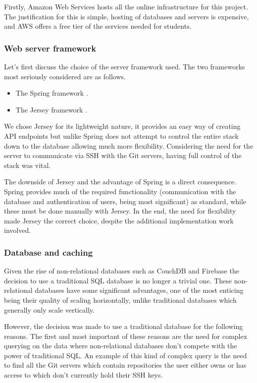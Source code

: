 Firstly, Amazon Web Services hosts all the online infrastructure for this project. The justification for this is simple, hosting of databases and servers is expensive, and AWS offers a free tier of the services needed for students.

\subsubsection{Web server framework}

Let's first discuss the choice of the server framework used. The two frameworks most seriously considered are as follows.

\begin{itemize}
\item The Spring framework \cite{spring}.
\item The Jersey framework \cite{jersey}.
\end{itemize}

We chose Jersey for its lightweight nature, it provides an easy way of creating API endpoints but unlike Spring does not attempt to control the entire stack down to the database allowing much more flexibility. Considering the need for the server to communicate via SSH with the Git servers, having full control of the stack was vital.

The downside of Jersey and the advantage of Spring is a direct consequence. Spring provides much of the required functionality (communication with the database and authentication of users, being most significant) as standard, while these must be done manually with Jersey. In the end, the need for flexibility made Jersey the correct choice, despite the additional implementation work involved.

\subsubsection{Database and caching}

Given the rise of non-relational databases such as CouchDB and Firebase the decision to use a traditional SQL database is no longer a trivial one. These non-relational databases have some significant advantages, one of the most enticing being their quality of scaling horizontally, unlike traditional databases which generally only scale vertically. 

However, the decision was made to use a traditional database for the following reasons. The first and most important of these reasons are the need for complex querying on the data where non-relational databases don't compete with the power of traditional SQL. An example of this kind of complex query is the need to find all the Git servers which contain repositories the user either owns or has access to which don't currently hold their SSH keys.

